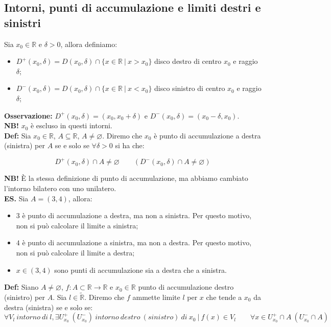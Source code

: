 \documentclass{article}
\begin{document}
\subsection{Intorni, punti di accumulazione e limiti destri e sinistri}
Sia $x_0 \in \mathbb{R}$ e $\delta > 0$, allora definiamo:

\begin{itemize}
    \item $D^+(x_0, \delta) = D(x_0, \delta) \cap \{x \in \mathbb{R} \ | \ x > x_0\}$ disco destro di centro $x_0$ e raggio $\delta$;
    \item $D^-(x_0, \delta) = D(x_0, \delta) \cap \{x \in \mathbb{R} \ | \ x < x_0\}$ disco sinistro di centro $x_0$ e raggio $\delta$;
\end{itemize}

\noindent\textbf{Osservazione:} $D^+(x_0, \delta) = (x_0, x_0 + \delta)$ e $D^-(x_0, \delta) = (x_0 - \delta, x_0)$.\\

\noindent\textbf{NB!} $x_0$ è escluso in questi intorni.\\

\noindent\textbf{Def: }Sia $x_0 \in \mathbb{R}$, $A \subseteq \mathbb{R}$, $A \neq \varnothing$. Diremo che $x_0$ è punto di accumulazione a destra (sinistra) per $A$ se e solo se $\forall \delta > 0$ si ha che:

\begin{equation*}
    D^+(x_0, \delta) \cap A \neq \varnothing \qquad (D^-(x_0, \delta) \cap A \neq \varnothing)
\end{equation*}

\noindent\textbf{NB!} È la stessa definizione di punto di accumulazione, ma abbiamo cambiato l'intorno bilatero con uno unilatero.\\

\noindent\textbf{ES.} Sia $A = (3, 4)$, allora:

\begin{itemize}
    \item $3$ è punto di accumulazione a destra, ma non a sinistra. Per questo motivo, non si può calcolare il limite a sinistra;
    \item $4$ è punto di accumulazione a sinistra, ma non a destra. Per questo motivo, non si può calcolare il limite a destra;
    \item $x \in (3, 4)$ sono punti di accumulazione sia a destra che a sinistra.
\end{itemize}

\noindent\textbf{Def:} Siano $A \neq \varnothing$, $f: A \subset \mathbb{R} \xrightarrow{} \mathbb{R}$ e $x_0 \in \mathbb{R}$ punto di accumulazione destro (sinistro) per $A$. Sia $l \in \widetilde{\mathbb{R}}$. Diremo che $f$ ammette limite $l$ per $x$ che tende a $x_0$ da destra (sinistra) se e solo se:
\begin{equation*}
    \forall V_l \ intorno \ di \ l, \exists U^+_{x_0} \ (U^-_{x_0}) \ intorno \ destro \ (sinistro) \ di \ x_0 \ | \ f(x) \in V_l \qquad \forall x \in U^+_{x_0} \cap A \ (U^-_{x_0} \cap A)
\end{equation*}
\end{document}
